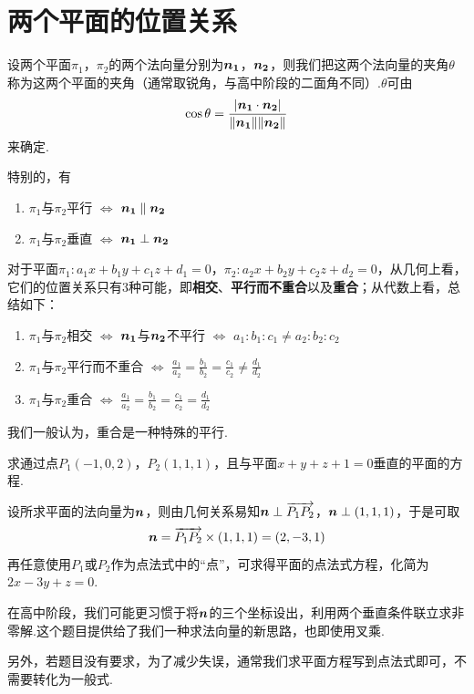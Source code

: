 \section{两个平面的位置关系}
\begin{definition}[两个平面的夹角]
  设两个平面$\pi_1$，$\pi_2$的两个法向量分别为$\vb*{n_1}$，$\vb*{n_2}$，则我们把这两个法向量的夹角$\theta$称为这两个平面的夹角（通常取锐角，与高中阶段的二面角不同）.$\theta$可由
  \begin{equation*}
    \cos{\theta} =  \frac{|\vb*{n_1} \cdot \vb*{n_2}|}{\| \vb*{n_1} \|\| \vb*{n_2} \|}
  \end{equation*}
  来确定.
\end{definition}
\par 特别的，有
\begin{enumerate}
  \item $\pi_1$与$\pi_2$平行 $\Leftrightarrow$ $\vb*{n_1} \parallel \vb*{n_2}$
  \item $\pi_1$与$\pi_2$垂直 $\Leftrightarrow$ $\vb*{n_1} \perp \vb*{n_2}$
\end{enumerate}
\par 对于平面$\pi_1:a_1x+b_1y+c_1z+d_1=0$，$\pi_2:a_2x+b_2y+c_2z+d_2=0$，从几何上看，它们的位置关系只有3种可能，即\textbf{相交}、\textbf{平行而不重合}以及\textbf{重合}；从代数上看，总结如下：
\begin{enumerate}
  \item $\pi_1$与$\pi_2$相交 $\Leftrightarrow$ $\vb*{n_1}$与$\vb*{n_2}$不平行 $\Leftrightarrow$ $a_1:b_1:c_1 \not= a_2:b_2:c_2$
  \item $\pi_1$与$\pi_2$平行而不重合 $\Leftrightarrow$ $\frac{a_1}{a_2}=\frac{b_1}{b_2}=\frac{c_1}{c_2} \not= \frac{d_1}{d_2}$
  \item $\pi_1$与$\pi_2$重合 $\Leftrightarrow$ $\frac{a_1}{a_2}=\frac{b_1}{b_2}=\frac{c_1}{c_2} = \frac{d_1}{d_2}$
\end{enumerate}
\begin{remark}
我们一般认为，重合是一种特殊的平行.
\end{remark}
\begin{example}
  求通过点$P_1(-1,0,2)$，$P_2(1,1,1)$，且与平面$x+y+z+1=0$垂直的平面的方程.
  \begin{solution}
    设所求平面的法向量为$\vb*{n}$，则由几何关系易知$\vb*{n} \perp \overrightarrow{P_1P_2} $，$\vb*{n} \perp (1,1,1)$，于是可取
    \begin{equation*}
      \vb*{n} = \overrightarrow{P_1P_2} \times (1,1,1) = (2,-3,1)
    \end{equation*}
    再任意使用$P_1$或$P_2$作为点法式中的“点”，可求得平面的点法式方程，化简为$2x-3y+z=0$.
  \end{solution}
  \begin{remark}
    在高中阶段，我们可能更习惯于将$\vb*{n}$的三个坐标设出，利用两个垂直条件联立求非零解.这个题目提供给了我们一种求法向量的新思路，也即使用叉乘.
    \par 另外，若题目没有要求，为了减少失误，通常我们求平面方程写到点法式即可，不需要转化为一般式.
  \end{remark}
\end{example}


